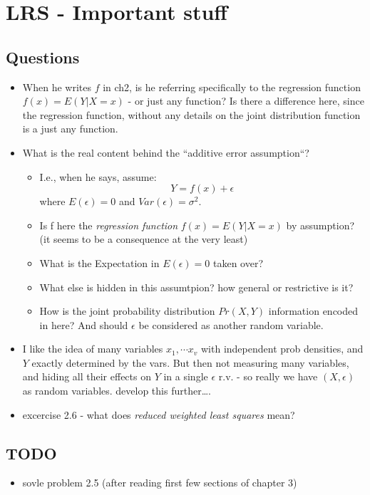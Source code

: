 

\maketitle
\chapter{LRS - Important stuff}
\section{Questions}
\begin{itemize}
  \item When he writes $f$ in ch2, is he referring specifically to the regression function $f(x) = E(Y|X=x)$ - or just any function? Is there a difference here, since the regression function, without any details on the joint distribution function is a just any function.
  \item What is the real content behind the ``additive error assumption``? 
    \begin{itemize}
      \item I.e., when he says, assume:
	    $$ Y = f(x) + \epsilon $$
	    where $E(\epsilon) = 0$ and $Var(\epsilon) = \sigma^2$.
	    \item Is f here the \emph{regression function} $f(x) = E(Y | X = x)$ by assumption? (it seems to be a consequence at the very least)
	    \item What is the Expectation in $E(\epsilon) = 0$ taken over?
	    \item What else is hidden in this assumtpion? how general or restrictive is it?
	    \item How is the joint probability distribution $Pr(X,Y)$ information encoded in here? And should $\epsilon$ be considered as another random variable.
	\end{itemize}
  \item I like the idea of many variables $x_1, \cdots x_v$ with independent prob densities, and $Y$ exactly determined by the vars. But then not measuring many variables, and hiding all their effects on $Y$ in a single $\epsilon$ r.v. -  so really we have $(X,\epsilon)$ as random variables.
    \subitem develop this further\ldots.
  \item excercise 2.6 - what does \emph{reduced weighted least squares} mean?
\end{itemize}

\section{TODO}
\begin{itemize}
  \item  sovle problem 2.5 (after reading first few sections of chapter 3)
\end{itemize}



